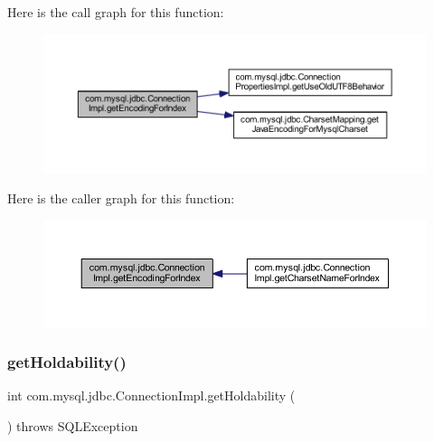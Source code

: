 Here is the call graph for this function\+:\nopagebreak
\begin{figure}[H]
\begin{center}
\leavevmode
\includegraphics[width=350pt]{classcom_1_1mysql_1_1jdbc_1_1_connection_impl_a66f46efa858fb96251057b1dd48ad028_cgraph}
\end{center}
\end{figure}
Here is the caller graph for this function\+:\nopagebreak
\begin{figure}[H]
\begin{center}
\leavevmode
\includegraphics[width=350pt]{classcom_1_1mysql_1_1jdbc_1_1_connection_impl_a66f46efa858fb96251057b1dd48ad028_icgraph}
\end{center}
\end{figure}
\mbox{\label{classcom_1_1mysql_1_1jdbc_1_1_connection_impl_a4f47c0fcfb613c617972ad7969c5fd6f}} 
\subsubsection{\texorpdfstring{get\+Holdability()}{getHoldability()}}
{\footnotesize\ttfamily int com.\+mysql.\+jdbc.\+Connection\+Impl.\+get\+Holdability (\begin{DoxyParamCaption}{ }\end{DoxyParamCaption}) throws S\+Q\+L\+Exception}

